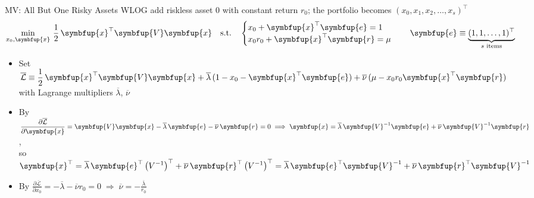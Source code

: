 \documentclass[10pt]{beamer}
\newcommand{\ds}{\displaystyle}
\newcommand{\ie}{\;\Longrightarrow\;}
\newcommand{\vx}{\symbfup{x}}
\newcommand{\vV}{\symbfup{V}}
\newcommand{\ve}{\symbfup{e}}
\newcommand{\vr}{\symbfup{r}}
\theoremstyle{definition}
\begin{document}
\begin{frame}{MV: All But One Risky Assets}
\onslide<+->
\noindent WLOG add riskless asset $0$ with constant return $r_0$; the portfolio becomes $(x_0, x_1, x_2, \ldots, x_s)^\top$ 
\onslide<+->
\begin{align*}
  \min_{x_0, \vx}\,\frac{1}{2}\,\vx^\top\vV\vx\quad\text{s.t.}\quad\begin{cases} x_0 + \vx^\top\ve = 1 \\ x_0 r_0 + \vx^\top\vr = \mu\end{cases}\quad\ve\equiv\underbrace{(1, 1, \ldots, 1)^\top}_{\text{$s$ items}}
\end{align*}
\begin{itemize}[<+->]
  \item Set $\ds\overline{\mathcal{L}}\equiv\frac{1}{2}\,\vx^\top\vV\vx + \overline{\lambda}\,(1 - x_0 - \vx^\top\ve) + \overline{\nu}\,(\mu - x_0 r_0 \vx^\top\vr)$ with Lagrange multipliers $\overline{\lambda}$, $\overline{\nu}$
  \item By $\ds\frac{\partial\overline{\mathcal{L}}}{\partial\vx} = \vV\vx - \overline{\lambda}\,\ve - \overline{\nu}\,\vr = 0\ie\vx = \overline{\lambda}\,\vV^{-1}\ve + \overline{\nu}\,\vV^{-1}\vr$, \\ so $\ds\vx^\top = \overline{\lambda}\,\ve^\top\left(V^{-1}\right)^\top + \overline{\nu}\,\vr^\top\left(V^{-1}\right)^\top = \overline{\lambda}\,\ve^\top\vV^{-1} + \overline{\nu}\,\vr^\top\vV^{-1}$
  \item By $\ds\frac{\partial\overline{\mathcal{L}}}{\partial x_0} = -\overline{\lambda} - \overline{\nu}r_0 = 0\ie\overline{\nu} = -\frac{\overline{\lambda}}{r_0}$
\end{itemize}

\end{frame}
\end{document}
